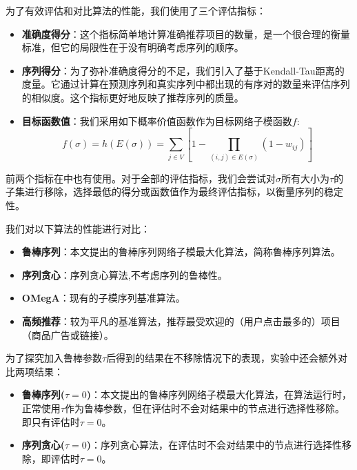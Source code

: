 为了有效评估和对比算法的性能，我们使用了三个评估指标：

\begin{itemize}
    \item \textbf{准确度得分}：这个指标简单地计算准确推荐项目的数量，是一个很合理的衡量标准，但它的局限性在于没有明确考虑序列的顺序。
    \item \textbf{序列得分}：为了弥补准确度得分的不足，我们引入了基于Kendall-Tau距离\cite{kendall1938new}的度量。它通过计算在预测序列和真实序列中都出现的有序对的数量来评估序列的相似度。这个指标更好地反映了推荐序列的质量。
    \item \textbf{目标函数值}：我们采用如下概率价值函数作为目标网络子模函数$f$:
\begin{equation}
    f(\sigma)=h(E(\sigma))=\sum_{j\in V} [1- \prod_{(i,j)\in E(\sigma)} (1-w_{ij})]
\end{equation}
\end{itemize}

前两个指标在\parencite{mitrovic2019adaptive}中也有使用。对于全部的评估指标，我们会尝试对$\sigma$所有大小为$\tau$的子集进行移除，选择最低的得分或函数值作为最终评估指标，以衡量序列的稳定性。

我们对以下算法的性能进行对比：

\begin{itemize}
\item {\bfseries 鲁棒序列}：本文提出的鲁棒序列网络子模最大化算法，简称鲁棒序列算法。
\item {\bfseries 序列贪心}：序列贪心算法\cite{mitrovic2018submodularity},不考虑序列的鲁棒性。
\item {\bfseries OMegA}：现有的子模序列基准算法\cite{tschiatschek2017selecting}。
\item {\bfseries 高频推荐}：较为平凡的基准算法，推荐最受欢迎的（用户点击最多的）项目（商品广告或链接）。
\end{itemize}

为了探究加入鲁棒参数$\tau$后得到的结果在不移除情况下的表现，实验中还会额外对比两项结果：
\begin{itemize}
\item {\bfseries 鲁棒序列($\tau = 0$)}：本文提出的鲁棒序列网络子模最大化算法，在算法运行时，正常使用$\tau$作为鲁棒参数，但在评估时不会对结果中的节点进行选择性移除。即只有评估时$\tau = 0$。
\item {\bfseries 序列贪心($\tau = 0$)}：序列贪心算法，在评估时不会对结果中的节点进行选择性移除，即评估时$\tau = 0$。
\end{itemize}



